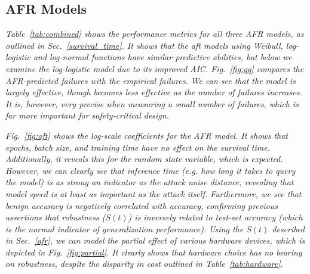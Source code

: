 \documentclass[conference]{IEEEtran}
\newcommand{\cm}[1]{\textit{{\color{blue}#1}}}
\begin{document}
\subsection{AFR Models}
\label{res:afr}
\cm{
Table~\ref{tab:combined} shows the performance metrics for all three AFR models, as outlined in Sec.~\ref{survival_time}. It shows that the aft models using Weibull, log-logistic and log-normal functions have similar predictive abilities, but below we examine the log-logistic model due to its improved AIC. Fig.~\ref{fig:qq} compares the AFR-predicted failures with the empirical failures. We can see that the model is largely effective, though becomes less effective as the number of failures increases. It is, however, very precise when measuring a small number of failures, which is far more important for safety-critical design. }

\cm{
Fig.~\ref{fig:aft} shows the log-scale coefficients for the AFR model. It shows that epochs, batch size, and training time have no effect on the survival time. Additionally, it reveals this for the random state variable, which is expected. However, we can clearly see that inference time (e.g. how long it takes to query the model) is as strong an indicator as the attack noise distance, revealing that model speed is at least as important as the attack itself. Furthermore, we see that benign accuracy is negatively correlated with accuracy, confirming previous assertions that robustness ($S(t)$) is inversely related to test-set accuracy (which is the normal indicator of generalization performance). 
}
\cm{
Using the $S(t)$ described in Sec.~\ref{afr}, we can model the partial effect of various hardware devices, which is depicted in Fig.~\ref{fig:partial}. It clearly shows that hardware choice has no bearing on robustness, despite the disparity in cost outlined in Table~\ref{tab:hardware}.
}
\end{document}
